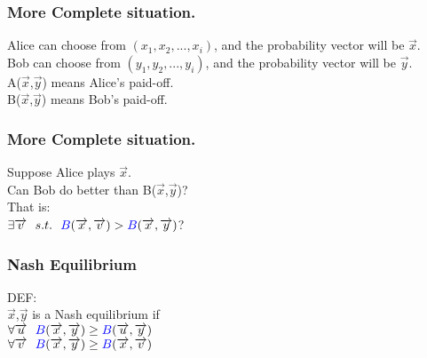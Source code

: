 \documentclass{beamer}
\begin{document}
\begin{frame}
\frametitle{More Complete situation.}
{\color{red}Alice} can choose from $(x_1,x_2,...,x_i)$, and the probability vector will be $\overrightarrow{x}$.\\
{\color{blue}Bob} can choose from $(y_1,y_2,...,y_i)$, and the probability vector will be $\overrightarrow{y}$.\\
{\color{red}A}($\overrightarrow{x}$,$\overrightarrow{y}$) means {\color{red}Alice}'s paid-off.\\
{\color{blue}B}($\overrightarrow{x}$,$\overrightarrow{y}$) means {\color{blue}Bob}'s paid-off.\\
\end{frame}

\begin{frame}
\frametitle{More Complete situation.}
Suppose {\color{red}Alice} plays $\overrightarrow{x}$.\\
Can {\color{blue}Bob} do better than {\color{blue}B}($\overrightarrow{x}$,$\overrightarrow{y}$)?\\
That is:\\
        \qquad $\exists \overrightarrow{v} ~~s.t. ~~{\color{blue}B}(\overrightarrow{x},\overrightarrow{v}) >{\color{blue}B}(\overrightarrow{x},\overrightarrow{y})$?
\end{frame}

\begin{frame}
\frametitle{Nash Equilibrium}
DEF:\\
\qquad $\overrightarrow{x}$,$\overrightarrow{y}$ is a Nash equilibrium if\\
\qquad $\forall \overrightarrow{u} ~~{\color{blue}B}(\overrightarrow{x},\overrightarrow{y}) \geq{\color{blue}B}(\overrightarrow{u},\overrightarrow{y})$\\
\qquad $\forall \overrightarrow{v} ~~{\color{blue}B}(\overrightarrow{x},\overrightarrow{y}) \geq{\color{blue}B}(\overrightarrow{x},\overrightarrow{v})$
\end{frame}
\end{document}

